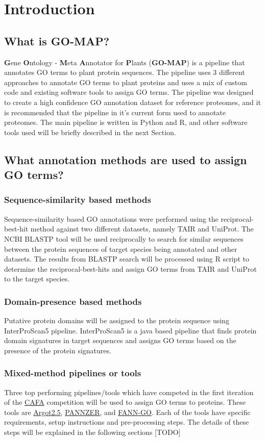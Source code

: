 \section{Introduction}
\label{sec:intro}

\subsection{What is GO-MAP?}
\textbf{G}ene \textbf{O}ntology - \textbf{M}eta \textbf{A}nnotator for \textbf{P}lants (\textbf{GO-MAP}) is a pipeline that annotates GO terms to plant protein sequences. The pipeline uses 3 different approaches to annotate GO terms to plant proteins and uses a mix of custom code and existing software tools to assign GO terms. The pipeline was designed to create a high confidence GO annotation dataset for reference proteomes, and it is recommended that the pipeline in it's current form used to annotate proteomes. The main pipeline is written in Python and R, and other software tools used will be briefly described in the next Section. 

\subsection{What annotation methods are used to assign GO terms?}
\subsubsection{Sequence-similarity based methods}
Sequence-similarity based GO annotations were performed using the reciprocal-best-hit method against two different datasets, namely TAIR and UniProt. The NCBI BLASTP tool will be used reciprocally to search for similar sequences between the protein sequences of target species being annotated and other datasets. The results from BLASTP search will be processed using R script to determine the reciprocal-best-hits and assign GO terms from TAIR and UniProt to the target species.

\subsubsection{Domain-presence based methods}
Putative protein domains will be assigned to the protein sequence using InterProScan5 pipeline. InterProScan5 is a java based pipeline that finds protein domain signatures in target sequences and assigns GO terms based on the presence of the protein signatures.

\subsubsection{Mixed-method pipelines or tools}
Three top performing pipelines/tools which have competed in the first iteration of the \href{http://biofunctionprediction.org}{CAFA} competition will be used to assign GO terms to proteins. These tools are \href{http://www.medcomp.medicina.unipd.it/Argot2-5/}{Argot2.5}, \href{http://ekhidna.biocenter.helsinki.fi/pannzer}{PANNZER}, and \href{http://montana.informatics.indiana.edu/fanngo/fanngo.html}{FANN-GO}. Each of the tools have specific requirements, setup instructions and pre-processing steps. The details of these steps will be explained in the following sections [TODO]